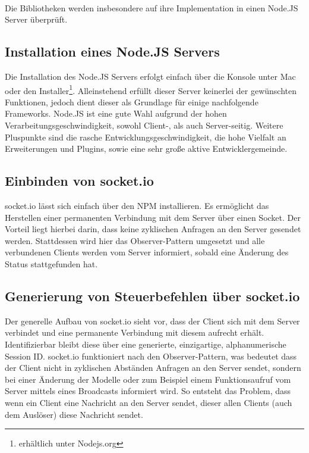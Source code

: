 \\Die Bibliotheken werden insbesondere auf ihre Implementation in einen Node.JS Server überprüft.

	\subsection{Installation eines Node.JS Servers}
	Die Installation des Node.JS Servers erfolgt einfach über die Konsole unter Mac oder den Installer\footnote{erhältlich unter Nodejs.org}. Alleinstehend erfüllt dieser Server keinerlei der gewünschten Funktionen, jedoch dient dieser als Grundlage für einige nachfolgende \Gls{Framework}s. Node.JS ist eine gute Wahl aufgrund der hohen Verarbeitungsgeschwindigkeit, sowohl Client-, als auch Server-seitig. Weitere Pluspunkte sind die rasche Entwicklungsgeschwindigkeit, die hohe Vielfalt an Erweiterungen und Plugins, sowie eine sehr große aktive Entwicklergemeinde.
	\subsection{Einbinden von socket.io}
	socket.io lässt sich einfach über den \Gls{NPM} installieren. Es ermöglicht das Herstellen einer permanenten Verbindung mit dem Server über einen Socket. Der Vorteil liegt hierbei darin, dass keine zyklischen Anfragen an den Server gesendet werden. Stattdessen wird hier das Observer-Pattern umgesetzt und alle verbundenen Clients werden vom Server informiert, sobald eine Änderung des Status stattgefunden hat. 
	
	\subsection{Generierung von Steuerbefehlen über socket.io}
	Der generelle Aufbau von socket.io sieht vor, dass der Client sich mit dem Server verbindet und eine permanente Verbindung mit diesem aufrecht erhält. Identifizierbar bleibt diese über eine generierte, einzigartige, alphanumerische Session ID. socket.io funktioniert nach den Observer-Pattern, was bedeutet dass der Client nicht in zyklischen Abständen Anfragen an den Server sendet, sondern bei einer Änderung der Modelle oder zum Beispiel einem Funktionsaufruf vom Server mittels eines Broadcasts informiert wird. So entsteht das Problem, dass wenn ein Client eine Nachricht an den Server sendet, dieser allen Clients (auch dem Auslöser) diese Nachricht sendet. 
	
	
